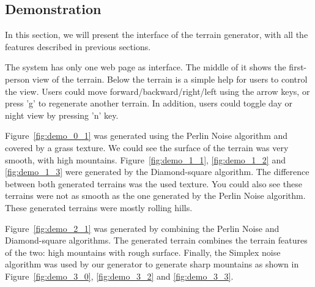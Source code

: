 \subsection{Demonstration}
In this section, we will present the interface of the terrain generator, with all the features described in previous sections. 

The system has only one web page as interface. The middle of it shows the first-person view of the terrain. Below the terrain is a simple help for users to control the view. Users could move forward/backward/right/left using the arrow keys, or press 'g' to regenerate another terrain. In addition, users could toggle day or night view by pressing 'n' key. 

Figure~\ref{fig:demo_0_1} was generated using the Perlin Noise algorithm and covered by a grass texture. We could see the surface of the terrain was very smooth, with high mountains. Figure~\ref{fig:demo_1_1}, \ref{fig:demo_1_2} and \ref{fig:demo_1_3} were generated by the Diamond-square algorithm. The difference between both generated terrains was the used texture. You could also see these terrains were not as smooth as the one generated by the Perlin Noise algorithm. These generated terrains were mostly rolling hills. 

Figure~\ref{fig:demo_2_1} was generated by combining the Perlin Noise and Diamond-square algorithms. The generated terrain combines the terrain features of the two: high mountains with rough surface. Finally, the Simplex noise algorithm was used by our generator to generate sharp mountains as shown in Figure~\ref{fig:demo_3_0}, \ref{fig:demo_3_2} and \ref{fig:demo_3_3}.

